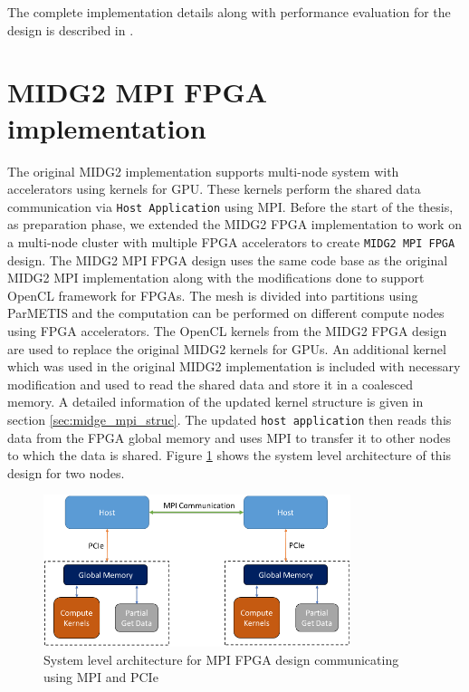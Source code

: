 The complete implementation details along with performance evaluation for the design
is described in \cite{kenter_opencl-based_2018}.

\section{MIDG2 MPI FPGA implementation}
\label{sec:midg2_mpi}

The original MIDG2 implementation supports multi-node system with accelerators using
kernels for GPU. These kernels perform the shared data communication via \texttt{Host Application}
using MPI. Before the start of the thesis, as preparation phase, we extended the MIDG2 FPGA
implementation to work on a multi-node cluster with multiple FPGA accelerators to create \texttt{MIDG2 MPI FPGA} design.
The MIDG2 \ac{MPI} FPGA design uses the same code base as the original MIDG2 \ac{MPI} implementation
along with the modifications done to support OpenCL framework for FPGAs.
The mesh is divided into partitions using ParMETIS and the computation can be performed on different
compute nodes using FPGA accelerators. The OpenCL kernels from the MIDG2 FPGA design are used to replace
the original MIDG2 kernels for GPUs. An additional kernel which was used in the original MIDG2
implementation is included with necessary modification and used to read the shared data and store it in a coalesced
memory. A detailed information of the updated kernel structure is given in section \ref{sec:midge_mpi_struc}.
The updated \texttt{host application} then reads this data from the FPGA global memory and uses
\ac{MPI} to transfer it to other nodes to which the data is shared. Figure
\ref{fig:mpi_fpga} shows the system level architecture of this design for two nodes.
\begin{figure}[ht]%
    \centering
    \includegraphics[width=0.8\textwidth]{images/mpi_fpga}
    \caption{System level architecture for MPI FPGA design communicating using MPI and PCIe}
    \label{fig:mpi_fpga}
\end{figure}

